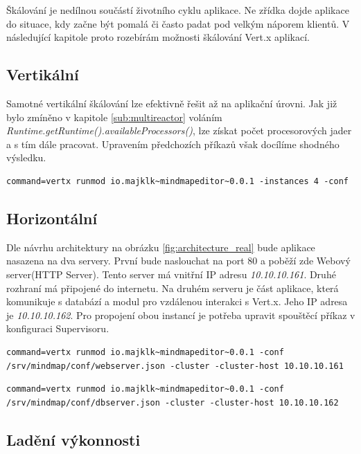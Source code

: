Škálování je nedílnou součástí životního cyklu aplikace. Ne zřídka dojde aplikace do situace, kdy začne být pomalá či často padat pod velkým náporem klientů. V následující kapitole proto rozebírám možnosti škálování Vert.x aplikací.

\FloatBarrier

\subsection{Vertikální}

Samotné vertikální škálování lze efektivně řešit až na aplikační úrovni. Jak již bylo zmíněno v kapitole \ref{sub:multireactor} voláním \emph{Runtime.getRuntime().availableProcessors()}, lze získat počet procesorových jader a s tím dále pracovat. Upravením předchozích příkazů však docílíme shodného výsledku.

\begin{lstlisting}
command=vertx runmod io.majklk~mindmapeditor~0.0.1 -instances 4 -conf
\end{lstlisting}

\subsection{Horizontální}\label{sub:praktCluster}

Dle návrhu architektury na obrázku \ref{fig:architecture_real} bude aplikace nasazena na dva servery. První bude naslouchat na port 80 a poběží zde Webový server(HTTP Server). Tento server má vnitřní IP adresu \emph{10.10.10.161}. Druhé rozhraní má připojené do internetu. Na druhém serveru je část aplikace, která komunikuje s databází a modul pro vzdálenou interakci s Vert.x. Jeho IP adresa je \emph{10.10.10.162}. Pro propojení obou instancí je potřeba upravit spouštěcí příkaz v konfiguraci Supervisoru.

\begin{lstlisting}[caption=Spuštění clusteru na Serveru 1]
command=vertx runmod io.majklk~mindmapeditor~0.0.1 -conf /srv/mindmap/conf/webserver.json -cluster -cluster-host 10.10.10.161
\end{lstlisting}

\begin{lstlisting}[caption=Spuštění clusteru na Serveru 2]
command=vertx runmod io.majklk~mindmapeditor~0.0.1 -conf /srv/mindmap/conf/dbserver.json -cluster -cluster-host 10.10.10.162
\end{lstlisting}

\subsection{Ladění výkonnosti}\label{sub:performenceScale}

